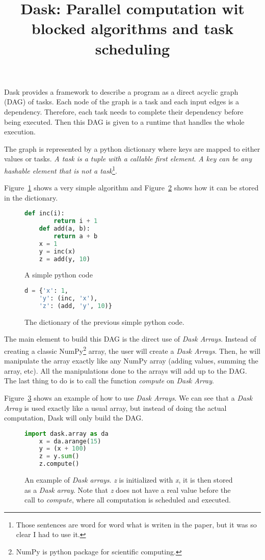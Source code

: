 \documentclass{article}
\title{Dask: Parallel computation wit blocked algorithms and task scheduling}
\begin{document}
\maketitle

Dask provides a framework to describe a program as a direct acyclic graph (DAG) of tasks.
Each node of the graph is a task and each input edges is a dependency.
Therefore, each task needs to complete their dependency before being executed.
Then this DAG is given to a runtime that handles the whole execution.

The graph is represented by a python dictionary where keys are mapped to either values or tasks.
\textit{A task is a tuple with a callable first element}.
\textit{A key can be any hashable element that is not a task}\footnote{Those sentences are word for word what is writen in the paper, but it was so clear I had to use it.}.

Figure~\ref{fig:simple-python} shows a very simple algorithm and Figure~\ref{fig:simple-python-encode} shows how it can be stored in the dictionary.
\begin{figure}[H] 
	\begin{lstlisting}[language=python]
	def inc(i):
		return i + 1
	def add(a, b):
		return a + b
	x = 1
	y = inc(x)
	z = add(y, 10)
	\end{lstlisting}
	\caption{A simple python code}
	\label{fig:simple-python}
\end{figure} 
\begin{figure}[H] 
	\begin{lstlisting}[language=python]
	d = {'x': 1,
	'y': (inc, 'x'),
	'z': (add, 'y', 10)}
	\end{lstlisting}
	\caption{The dictionary of the previous simple python code.}
	\label{fig:simple-python-encode}
\end{figure} 

The main element to build this DAG is the direct use of \textit{Dask Arrays}.
Instead of creating a classic NumPy\footnote{NumPy is python package for scientific computing.} array, the user will create a \textit{Dask Arrays}.
Then, he will manipulate the array exactly like any NumPy array (adding values, summing the array, etc).
All the manipulations done to the arrays will add up to the DAG.
The last thing to do is to call the function \textit{compute} on \textit{Dask Array}.

Figure~\ref{fig:example-dask} shows an example of how to use \textit{Dask Arrays}.
We can see that a \textit{Dask Array} is used exactly like a usual array, but instead
of doing the actual computation, Dask will only build the DAG.
\begin{figure}[h] 
	\center
	\begin{lstlisting}[language=python]
	import dask.array as da
	x = da.arange(15)
	y = (x + 100)
	z = y.sum()
	z.compute()
	\end{lstlisting}
	\caption{An example of \textit{Dask arrays}. \textit{z} is initialized with \textit{x}, it is then stored as a
	\textit{Dask array}. Note that \textit{z} does not have a real value before the call to \textit{compute}, where all computation is scheduled and executed.}
	\label{fig:example-dask}
\end{figure} 
\end{document}

